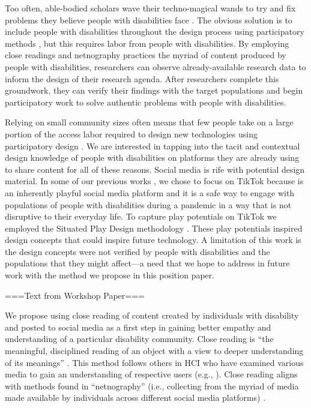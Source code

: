 Too often, able-bodied scholars wave their techno-magical wands to try and fix problems they believe people with disabilities face \cite{morozovEverythingClickHere2013,charltonNothingUsUs2000}. The obvious solution is to include people with disabilities throughout the design process using participatory methods \cite{bodkerParticipatoryDesignThat2018,storyPrinciplesUniversalDesign2001}, but this requires labor from people with disabilities.  By employing close readings \cite{brummettTechniquesCloseReading2018} and netnography practices \cite{kozinetsNetnographyEssentialGuide2019} the myriad of content produced by people with disabilities, researchers can observe already-available research data to inform the design of their research agenda. After researchers complete this groundwork, they can verify their findings with the target populations and begin participatory work to solve authentic problems with people with disabilities.

Relying on small community sizes often means that few people take on a large portion of the access labor required to design new technologies using participatory design \cite{mackWhatWeMean2021,bennettBiographicalPrototypesReimagining2019}. We are interested in tapping into the tacit and contextual design knowledge of people with disabilities on platforms they are already using to share content for all of these reasons.  Social media is rife with potential design material. In some of our previous works \cite{duvalChasingPlayTikTok2021}, we chose to focus on TikTok because is an inherently playful social media platform and it is a safe way to engage with populations of people with disabilities during a pandemic in a way that is not disruptive to their everyday life. To capture play potentials \cite{altarribabertranChasingPlayPotentials2019} on TikTok we employed the Situated Play Design methodology \cite{altarribabertranChasingPlayPotentials2019a}. These play potentials inspired design concepts that could inspire future technology. A limitation of this work is the design concepts were not verified by people with disabilities and the populations that they might affect—a need that we hope to address in future work with the method we propose in this position paper. 


===Text from Workshop Paper===

We propose using close reading of content created by individuals with disability and posted to social media as a first step in gaining better empathy and understanding of a particular disability community. Close reading is ``the meaningful, disciplined reading of an object with a view to deeper understanding of its meanings'' \cite{brummettTechniquesCloseReading2018}. This method follows others in HCI who have examined various media to gain an understanding of respective users (e.g., \cite{alticeAmErrorNintendo2015,sackSoftwareArts2019}). Close reading aligns with methods found in ``netnography'' (i.e., collecting from the myriad of media made available by individuals across different social media platforms) \cite{kozinetsNetnographyEssentialGuide2019}.



